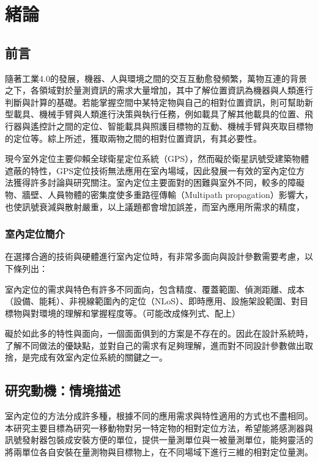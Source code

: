 \chapter{緒論}


\section{前言} %

隨著工業4.0的發展，機器、人與環境之間的交互互動愈發頻繁，萬物互連的背景之下，各領域對於量測資訊的需求大量增加，其中了解位置資訊為機器與人類進行判斷與計算的基礎。若能掌握空間中某特定物與自己的相對位置資訊，則可幫助新型載具、機械手臂與人類進行決策與執行任務，例如載具了解其他載具的位置、飛行器與遙控計之間的定位、智能載具與照護目標物的互動、機械手臂與夾取目標物的定位等。綜上所述，獲取兩物之間的相對位置資訊，有其必要性。

現今室外定位主要仰賴全球衛星定位系統（GPS），然而礙於衛星訊號受建築物體遮蔽的特性，GPS定位技術無法應用在室內場域，因此發展一有效的室內定位方法獲得許多討論與研究關注。室內定位主要面對的困難與室外不同，較多的障礙物、牆壁、人員物體的密集度使多重路徑傳輸（Multipath propagation）影響大，也使訊號衰減與散射嚴重，以上議題都會增加誤差，而室內應用所需求的精度，


\subsection{室內定位簡介}


在選擇合適的技術與硬體進行室內定位時，有非常多面向與設計參數需要考慮，以下條列出：

室內定位的需求與特色有許多不同面向，包含精度、覆蓋範圍、偵測距離、成本（設備、能耗）、非視線範圍內的定位（NLoS）、即時應用、設施架設範圍、對目標物與對環境的理解和掌握程度等。（可能改成條列式、配上）

礙於如此多的特性與面向，一個面面俱到的方案是不存在的。因此在設計系統時，了解不同做法的優缺點，並對自己的需求有足夠理解，進而對不同設計參數做出取捨，是完成有效室內定位系統的關鍵之一。





\section{研究動機：情境描述}
室內定位的方法分成許多種，根據不同的應用需求與特性適用的方式也不盡相同。本研究主要目標為研究一移動物對另一特定物的相對定位方法，希望能將感測器與訊號發射器包裝成安裝方便的單位，提供一量測單位與一被量測單位，能夠靈活的將兩單位各自安裝在量測物與目標物上，在不同場域下進行三維的相對定位量測。

